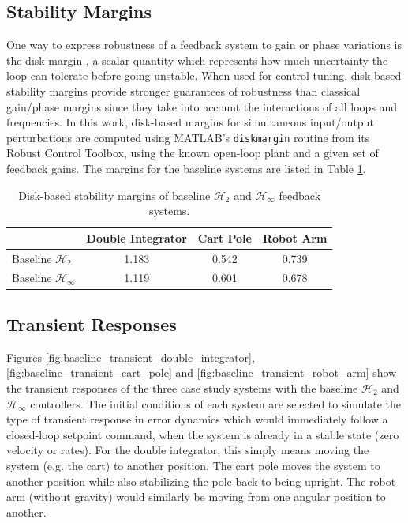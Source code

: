 \subsection{Stability Margins}
One way to express robustness of a feedback system to gain or phase variations is the disk margin \cite{seiler2020introduction}, a scalar quantity which represents how much uncertainty the loop can tolerate before going unstable.  When used for control tuning, disk-based stability margins provide stronger guarantees of robustness than classical gain/phase margins since they take into account the interactions of all loops and frequencies.  In this work, disk-based margins for simultaneous input/output perturbations are computed using MATLAB's \texttt{diskmargin} routine from its Robust Control Toolbox, using the known open-loop plant and a given set of feedback gains.  The margins for the baseline systems are listed in Table \ref{table:baseline_disk_margins}.
\begin{table}[H]
\centering
\begin{tabular}{| l || c | c | c |} 
	\hline
	 & Double Integrator & Cart Pole & Robot Arm\\
	\hline\hline
	Baseline $\mathcal{H}_{2}$ & 1.183 & 0.542 & 0.739\\
	\hline
	Baseline $\mathcal{H}_{\infty}$ & 1.119 & 0.601 & 0.678\\
	\hline
\end{tabular}
\caption{Disk-based stability margins of baseline $\mathcal{H}_{2}$ and $\mathcal{H}_{\infty}$ feedback systems.}
\label{table:baseline_disk_margins}
\end{table}

\subsection{Transient Responses}
Figures \ref{fig:baseline_transient_double_integrator}, \ref{fig:baseline_transient_cart_pole} and \ref{fig:baseline_transient_robot_arm} show the transient responses of the three case study systems with the baseline $\mathcal{H}_{2}$ and $\mathcal{H}_{\infty}$ controllers.  The initial conditions of each system are selected to simulate the type of transient response in error dynamics which would immediately follow a closed-loop setpoint command, when the system is already in a stable state (zero velocity or rates).  For the double integrator, this simply means moving the system (e.g. the cart) to another position.  The cart pole moves the system to another position while also stabilizing the pole back to being upright.  The robot arm (without gravity) would similarly be moving from one angular position to another.

